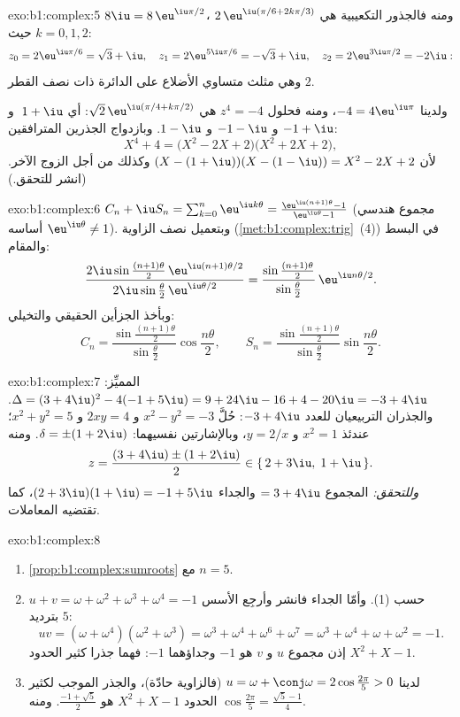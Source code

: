 \begin{solution}{exo:b1:complex:5}
$8\iu = 8\,\eu^{\iu\pi/2}$، ومنه فالجذور التكعيبية هي $2\,\eu^{\iu(\pi/6 +
2k\pi/3)}$ حيث $k = 0, 1, 2$:
\[
z_0 = 2\eu^{\iu\pi/6} = \sqrt 3 + \iu,\quad
z_1 = 2\eu^{5\iu\pi/6} = -\sqrt 3 + \iu,\quad
z_2 = 2\eu^{3\iu\pi/2} = -2\iu :
\]
وهي مثلث متساوي الأضلاع على الدائرة ذات نصف القطر $2$.

ولدينا $-4 = 4\eu^{\iu\pi}$، ومنه فحلول $z^4 = -4$ هي $\sqrt 2\,
\eu^{\iu(\pi/4 + k\pi/2)}$: أي $\;1 + \iu$ و $-1 + \iu$ و $-1 - \iu$
و $1 - \iu$. وبازدواج الجذرين المترافقين:
\[
X^4 + 4 = \bigl(X^2 - 2X + 2\bigr)\bigl(X^2 + 2X + 2\bigr),
\]
لأن $(X - (1+\iu))(X - (1-\iu)) = X^2 - 2X + 2$ وكذلك من أجل
الزوج الآخر. (انشر للتحقق.)
\end{solution}

\begin{solution}{exo:b1:complex:6}
$C_n + \iu S_n = \sum_{k=0}^{n} \eu^{\iu k\theta} =
\frac{\eu^{\iu(n+1)\theta} - 1}{\eu^{\iu\theta} - 1}$ (مجموع هندسي
أساسه $\eu^{\iu\theta} \neq 1$). وبتعميل نصف الزاوية
(\cref{met:b1:complex:trig}~(4)) في البسط والمقام:
\[
\frac{2\iu\sin\frac{(n+1)\theta}{2}\, \eu^{\iu(n+1)\theta/2}}
{2\iu\sin\frac{\theta}{2}\, \eu^{\iu\theta/2}}
= \frac{\sin\frac{(n+1)\theta}{2}}{\sin\frac{\theta}{2}}\,
\eu^{\iu n\theta/2}.
\]
وبأخذ الجزأين الحقيقي والتخيلي:
\[
C_n = \frac{\sin\frac{(n+1)\theta}{2}}{\sin\frac{\theta}{2}}
\cos\frac{n\theta}{2},
\qquad
S_n = \frac{\sin\frac{(n+1)\theta}{2}}{\sin\frac{\theta}{2}}
\sin\frac{n\theta}{2}.
\]
\end{solution}

\begin{solution}{exo:b1:complex:7}
المميِّز: $\Delta = (3 + 4\iu)^2 - 4(-1 + 5\iu) = 9 + 24\iu - 16 +
4 - 20\iu = -3 + 4\iu$. والجذران التربيعيان للعدد $-3 + 4\iu$: حُلَّ $x^2 - y^2
= -3$ و $2xy = 4$ و $x^2 + y^2 = 5$؛ عندئذ $x^2 = 1$ و $y = 2/x$، وبالإشارتين
نفسيهما: $\delta = \pm(1 + 2\iu)$. ومنه
\[
z = \frac{(3 + 4\iu) \pm (1 + 2\iu)}{2}
\in \{\, 2 + 3\iu,\; 1 + \iu \,\}.
\]
\emph{وللتحقق:} المجموع $= 3 + 4\iu$ والجداء $(2+3\iu)(1+\iu) = -1 +
5\iu$، كما تقتضيه المعاملات.
\end{solution}

\begin{solution}{exo:b1:complex:8}
\begin{enumerate}
  \item \cref{prop:b1:complex:sumroots} مع $n = 5$.
  \item $u + v = \omega + \omega^2 + \omega^3 + \omega^4 = -1$ حسب (1).
        وأمّا الجداء فانشر وأرجِع الأسس بترديد $5$:
        \[
        uv = (\omega + \omega^4)(\omega^2 + \omega^3)
        = \omega^3 + \omega^4 + \omega^6 + \omega^7
        = \omega^3 + \omega^4 + \omega + \omega^2 = -1 .
        \]
        إذن مجموع $u$ و $v$ هو $-1$ وجداؤهما $-1$: فهما
        جذرا كثير الحدود $X^2 + X - 1$.
  \item لدينا $u = \omega + \conj\omega = 2\cos\frac{2\pi}{5} > 0$ (فالزاوية
        حادّة)، والجذر الموجب لكثير الحدود $X^2 + X - 1$ هو
        $\frac{-1 + \sqrt 5}{2}$. ومنه $\cos\frac{2\pi}{5} =
        \frac{\sqrt 5 - 1}{4}$.
\end{enumerate}
\end{solution}

